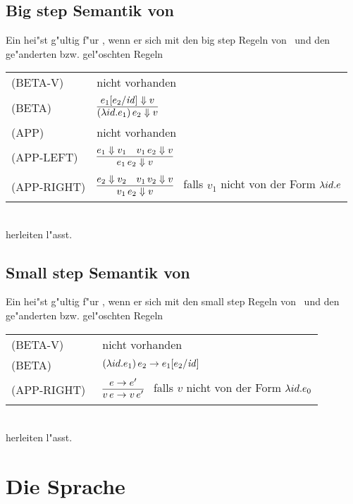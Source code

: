 \subsection{Big step Semantik von \LZEROCBN}

Ein  hei"st g"ultig f"ur \LZEROCBN, wenn er sich mit den big step Regeln von \LZERO\ und den ge"anderten bzw. gel"oschten Regeln\\[5mm]
  \begin{tabular}{ll}
     \mbox{(BETA-V)}      & nicht vorhanden \\[3mm]
     \mbox{(BETA)}        & $\regel{e_1[e_2/\id] \eval v}
                                   {(\abstr{id}{e_1})\,e_2 \eval v}$ \\[5mm]
     \mbox{(APP)}         & nicht vorhanden \\[3mm]
     \mbox{(APP-LEFT)}    & $\regel{e_1 \eval v_1 \quad v_1\,e_2 \eval v}
                                   {e_1\,e_2 \eval v}$ \\[3mm]
     \mbox{(APP-RIGHT)}   & $\regel{e_2 \eval v_2 \quad v_1\,v_2 \eval v}
                                   {v_1\,e_2 \eval v}$   \ 
                                   falls ${v_1}$ nicht von der Form $\lambda id.e$
  \end{tabular}\\[7mm]
herleiten l"asst.


\subsection{Small step Semantik von \LZEROCBN}

Ein  hei"st g"ultig f"ur \LZEROCBN, wenn er sich mit den small step Regeln von \LZERO\ 
und den ge"anderten bzw. gel"oschten Regeln\\[5mm]
  \begin{tabular}{ll}
     \mbox{(BETA-V)}      & nicht vorhanden \\[3mm]
     \mbox{(BETA)}        & $(\lambda id.e_1)\,e_2 \to e_1[e_2/{\text{\it id\/}}]$ \\[5mm]
     \mbox{(APP-RIGHT)\ } & $\regel{e \to e'}
                                   {v\,e \to v\,e'}$   \ 
                                   falls ${v}$ nicht von der Form $\lambda id.e_0$
  \end{tabular}\\[7mm]
herleiten l"asst.



\section{Die Sprache \LONE}

